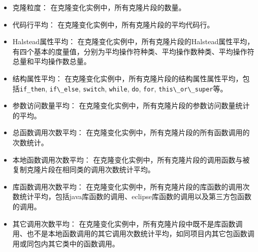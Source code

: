\begin{itemize}
\item 
克隆粒度：
在克隆变化实例中，所有克隆片段的数量。
\item 
代码行平均：
在克隆变化实例中，所有克隆片段的平均代码行。
\item 
Halstead属性平均：
在克隆变化实例中，所有克隆片段的Halstead属性平均，有四个基本的度量值，分别为平均操作符种类、平均操作数种类、平均操作符总量和平均操作数总量。
\item
结构属性平均：
在克隆变化实例中，所有克隆片段的结构属性属性平均，包括\verb+if_then+, \verb+if\_else+, \verb+switch+, \verb+while+, \verb+do+, \verb+for+,  \verb+this\_or\_super+等。 
\item 
参数访问数量平均：
在克隆变化实例中，所有克隆片段的参数访问数量统计的平均。
\item  
总函数调用次数平均：
在克隆变化实例中，所有克隆片段的所有函数调用的次数统计。
\item  
本地函数调用次数平均：
在克隆变化实例中，所有克隆片段的调用函数与被复制克隆片段在相同类的调用次数统计平均。
\item  
库函数调用次数平均：
在克隆变化实例中，所有克隆片段的库函数的调用次数统计平均，包括java库函数的调用、eclipse库函数的调用以及第三方包函数的调用。
\item  
其它调用次数平均：
在克隆变化实例中，所有克隆片段中既不是库函数调用、也不是本地函数调用的其它调用次数统计平均，如同项目内其它包函数调用或同包内其它类中的函数调用。
\end{itemize}



